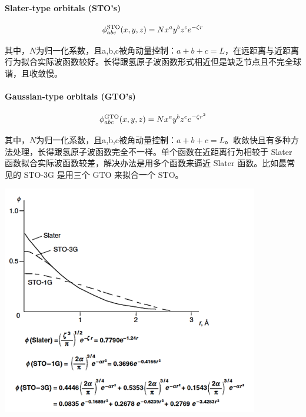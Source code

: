 \paragraph*{Slater-type orbitals (STO's)}
\[\phi_{abc}^{\rm{STO}}(x,y,z)=Nx^ay^bz^ce^{-\zeta r}\]

其中，$N$为归一化系数，且a,b,c被角动量控制：$a+b+c=L$，在远距离与近距离行为拟合实际波函数较好。长得跟氢原子波函数形式相近但是缺乏节点且不完全球谐，且收敛慢。

\paragraph*{Gaussian-type orbitals (GTO's)}
\[\phi_{abc}^{\rm{GTO}}(x,y,z)=Nx^ay^bz^ce^{-\zeta r^2}\]

其中，$N$为归一化系数，且a,b,c被角动量控制：$a+b+c=L$。收敛快且有多种方法处理，长得跟氢原子波函数完全不一样。单个函数在近距离行为相较于 Slater 函数拟合实际波函数较差，解决办法是用多个函数来逼近 Slater 函数。比如最常见的 STO-3G 是用三个 GTO 来拟合一个 STO。

\begin{center}
    \includegraphics{fig/lzhx/微信图片_20211102165150}
\end{center}

